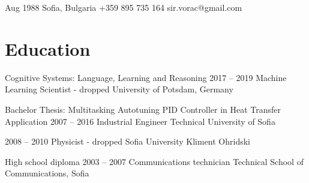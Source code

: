\documentclass{tccv}
\begin{document}
\mypersonal
    {Aug 1988}
    {Sofia, Bulgaria}
    {+359 895 735 164}
    {sir.vorac@gmail.com}

\section{Education}
\begin{yearlist}
\item[{\footnotesize Cognitive Systems: Language, Learning and Reasoning}]
     {2017 -- 2019}
     {Machine Learning Scientist - dropped}
     {University of Potsdam, Germany}

\item[Bachelor Thesis:                 \newline
     {\footnotesize Multitasking Autotuning PID Controller in Heat Transfer Application}]
     {2007 -- 2016}
     {Industrial Engineer}
     {Technical University of Sofia}

\item[]
     {2008 -- 2010}
     {Physicist - dropped}
     {Sofia University Kliment Ohridski}

\item[High school diploma]{2003 -- 2007}
     {Communications technician}
     {Technical School of Communications, Sofia}
\end{yearlist}


\newpage
\end{document}
